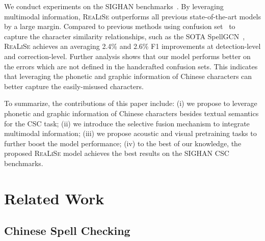 \documentclass[11pt,a4paper]{article}
\newcommand\model{\textsc{ReaLiSe}}
\newcommand{\cjksong}[1]{{{\begin{CJK*}{UTF8}{gbsn}#1\end{CJK*}}}}
\begin{document}
We conduct experiments on the SIGHAN benchmarks~\citep{sighan13, sighan14, sighan15}.
By leveraging multimodal information, \model{} outperforms all previous state-of-the-art models by a large margin.
Compared to previous methods using confusion set~\cite{conf} to capture the character similarity relationships, such as the SOTA SpellGCN~\citep{spellgcn}, \model{} achieves an averaging 2.4\% and 2.6\%  F1 improvements at detection-level and correction-level. 
Further analysis shows that our model performs better on the errors which are not defined in the handcrafted confusion sets.
This indicates that leveraging the phonetic and graphic information of Chinese characters can better capture the easily-misused characters.


To summarize, the contributions of this paper include:
(i) we propose to leverage phonetic and graphic information of Chinese characters besides textual semantics for the CSC task;
(ii) we introduce the selective fusion mechanism to integrate multimodal information;
(iii) we propose acoustic and visual pretraining tasks to further boost the model performance;
(iv) to the best of our knowledge, the proposed \model{} model achieves the best results on the SIGHAN CSC  benchmarks.



\section{Related Work}

\subsection{Chinese Spell Checking}
\end{document}
